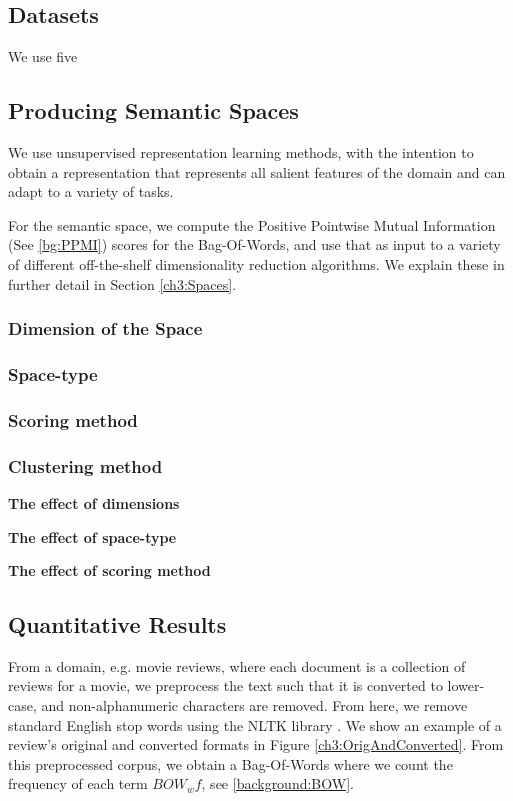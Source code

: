 \subsection{Datasets}

We use five 

\subsection{Producing Semantic Spaces}

We use unsupervised representation learning methods, with the intention to obtain a representation that represents all salient features of the domain and can adapt to a variety of tasks. 

For the semantic space, we compute the Positive Pointwise Mutual Information (See \ref{bg:PPMI}) scores for the Bag-Of-Words, and use that as input to a variety of different off-the-shelf dimensionality reduction algorithms. We explain these in further detail in Section \ref{ch3:Spaces}. 

\subsubsection{Dimension of the Space}

\subsubsection{Space-type}

\subsubsection{Scoring method}

\subsubsection{Clustering method}

\textbf{The effect of dimensions}


\textbf{The effect of space-type}

\textbf{The effect of scoring method}

\subsection{Quantitative Results}
From a domain, e.g. movie reviews, where each document is a collection of reviews for a movie, we preprocess the text such that it is converted to lower-case, and non-alphanumeric characters are removed. From here, we remove standard English stop words using the NLTK library \cite{Bird}. We show an example of a review's original and converted formats in Figure \ref{ch3:OrigAndConverted}. From this preprocessed corpus, we obtain a Bag-Of-Words where we count the frequency of each term $BOW_wf$, see \ref{background:BOW}. 

